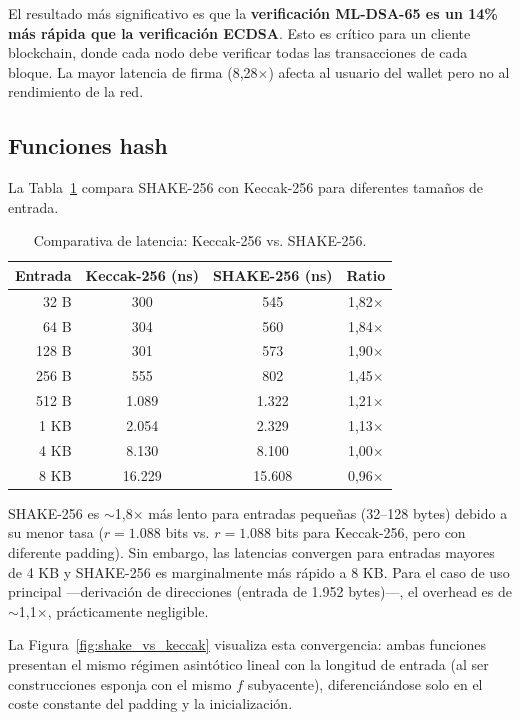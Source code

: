 El resultado más significativo es que la \textbf{verificación ML-DSA-65 es un 14\% más rápida que la verificación ECDSA}. Esto es crítico para un cliente blockchain, donde cada nodo debe verificar todas las transacciones de cada bloque. La mayor latencia de firma (8,28$\times$) afecta al usuario del wallet pero no al rendimiento de la red.

\subsection{Funciones hash}

La Tabla~\ref{tab:hash_bench} compara SHAKE-256 con Keccak-256 para diferentes tamaños de entrada.

\begin{table}[htbp]
\centering
\caption{Comparativa de latencia: Keccak-256 vs. SHAKE-256.}
\label{tab:hash_bench}
\begin{tabular}{@{}rccc@{}}
\toprule
\textbf{Entrada} & \textbf{Keccak-256 (ns)} & \textbf{SHAKE-256 (ns)} & \textbf{Ratio} \\
\midrule
32 B & 300 & 545 & 1,82$\times$ \\
64 B & 304 & 560 & 1,84$\times$ \\
128 B & 301 & 573 & 1,90$\times$ \\
256 B & 555 & 802 & 1,45$\times$ \\
512 B & 1.089 & 1.322 & 1,21$\times$ \\
1 KB & 2.054 & 2.329 & 1,13$\times$ \\
4 KB & 8.130 & 8.100 & 1,00$\times$ \\
8 KB & 16.229 & 15.608 & 0,96$\times$ \\
\bottomrule
\end{tabular}
\end{table}

SHAKE-256 es $\sim$1,8$\times$ más lento para entradas pequeñas (32--128 bytes) debido a su menor tasa ($r = 1.088$ bits vs. $r = 1.088$ bits para Keccak-256, pero con diferente padding). Sin embargo, las latencias convergen para entradas mayores de 4 KB y SHAKE-256 es marginalmente más rápido a 8 KB. Para el caso de uso principal ---derivación de direcciones (entrada de 1.952 bytes)---, el overhead es de $\sim$1,1$\times$, prácticamente negligible.

La Figura~\ref{fig:shake_vs_keccak} visualiza esta convergencia: ambas funciones presentan el mismo régimen asintótico lineal con la longitud de entrada (al ser construcciones esponja con el mismo $f$ subyacente), diferenciándose solo en el coste constante del padding y la inicialización.

